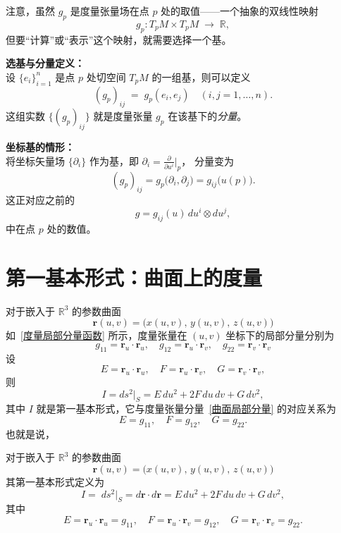 注意，虽然 \(g_p\) 是度量张量场在点 \(p\) 处的取值——一个抽象的双线性映射
\[
g_p: T_pM \times T_pM \;\longrightarrow\; \mathbb{R},
\]
但要“计算”或“表示”这个映射，就需要选择一个基。

\bigskip

\noindent
\textbf{选基与分量定义：}\\
设 \(\{e_i\}_{i=1}^n\) 是点 \(p\) 处切空间 \(T_pM\) 的一组基，则可以定义
\[
(g_p)_{ij} \;=\; g_p(e_i,e_j)
\quad (i,j=1,\dots,n).
\]
这组实数 \(\{(g_p)_{ij}\}\) 就是度量张量 \(g_p\) 在该基下的\emph{分量}。  

\medskip

\noindent
\textbf{坐标基的情形：}\\
将坐标矢量场 \(\{\partial_i\}\) 作为基，即
\(\partial_i = \frac{\partial}{\partial u^i}\big|_p\)，
分量变为
\[
(g_p)_{ij}
= g_p\bigl(\partial_i,\partial_j\bigr)
= g_{ij}\bigl(u(p)\bigr).
\]
这正对应之前的
\[
g = g_{ij}(u)\,du^i\otimes du^j,
\]
中在点 \(p\) 处的数值。

\section{第一基本形式：曲面上的度量}

对于嵌入于 \(\mathbb{R}^3\) 的参数曲面
\[
\mathbf r(u,v) = \bigl(x(u,v),\,y(u,v),\,z(u,v)\bigr)
\]
如~\eqref{度量局部分量函数} 所示，度量张量在 \((u,v)\) 坐标下的局部分量分别为
\begin{equation}\label{曲面局部分量}
g_{11} = \mathbf r_u\cdot\mathbf r_u,\quad
g_{12} = \mathbf r_u\cdot\mathbf r_v,\quad
g_{22} = \mathbf r_v\cdot\mathbf r_v
\end{equation}
设
\[
E = \mathbf r_u\cdot\mathbf r_u,\quad
F = \mathbf r_u\cdot\mathbf r_v,\quad
G = \mathbf r_v\cdot\mathbf r_v,
\]
则
\[
I = ds^2\big|_S
= E\,du^2 + 2F\,du\,dv + G\,dv^2,
\]
其中 \(I\) 就是第一基本形式，它与度量张量分量~\eqref{曲面局部分量} 的对应关系为
\[
E = g_{11},\quad F = g_{12},\quad G = g_{22}.
\]
也就是说，

\begin{definition}
对于嵌入于 \(\mathbb{R}^3\) 的参数曲面 
\[
\mathbf r(u,v) = \bigl(x(u,v),\,y(u,v),\,z(u,v)\bigr)
\]
其第一基本形式定义为
$$
I = \; ds^2\big|_S=d\mathbf{r}\cdot d\mathbf{r}
= E\,du^2 + 2F\,du\,dv + G\,dv^2,
$$
其中
$$
E= \mathbf{r}_u\cdot\mathbf{r}_u=g_{11},\quad
F = \mathbf{r}_u\cdot\mathbf{r}_v = g_{12},\quad
G =\mathbf{r}_v\cdot\mathbf{r}_v=g_{22}.
$$
\end{definition}

